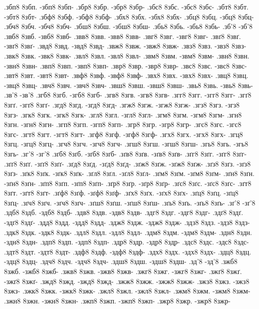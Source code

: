 {.збп8 8збп. -збп8 8збп-
.збр8 8збр. -збр8 8збр-
.збс8 8збс. -збс8 8збс-
.збт8 8збт. -збт8 8збт-
.збф8 8збф. -збф8 8збф-
.збх8 8збх. -збх8 8збх-
.збц8 8збц. -збц8 8збц-
.збч8 8збч. -збч8 8збч-
.збш8 8збш. -збш8 8збш-
.збь8 8збь. -збь8 8збь-
.зб'8 -зб'8
.звб8 8звб. -звб8 8звб-
.звв8 8звв. -звв8 8звв-
.звг8 8звг. -звг8 8звг-
.звґ8 8звґ. -звґ8 8звґ-
.звд8 8звд. -звд8 8звд-
.звж8 8звж. -звж8 8звж-
.звз8 8звз. -звз8 8звз-
.звк8 8звк. -звк8 8звк-
.звл8 8звл. -звл8 8звл-
.звм8 8звм. -звм8 8звм-
.звн8 8звн. -звн8 8звн-
.звп8 8звп. -звп8 8звп-
.звр8 8звр. -звр8 8звр-
.звс8 8звс. -звс8 8звс-
.звт8 8звт. -звт8 8звт-
.звф8 8звф. -звф8 8звф-
.звх8 8звх. -звх8 8звх-
.звц8 8звц. -звц8 8звц-
.звч8 8звч. -звч8 8звч-
.звш8 8звш. -звш8 8звш-
.звь8 8звь. -звь8 8звь-
.зв'8 -зв'8
.згб8 8згб. -згб8 8згб-
.згв8 8згв. -згв8 8згв-
.згг8 8згг. -згг8 8згг-
.згґ8 8згґ. -згґ8 8згґ-
.згд8 8згд. -згд8 8згд-
.згж8 8згж. -згж8 8згж-
.згз8 8згз. -згз8 8згз-
.згк8 8згк. -згк8 8згк-
.згл8 8згл. -згл8 8згл-
.згм8 8згм. -згм8 8згм-
.згн8 8згн. -згн8 8згн-
.згп8 8згп. -згп8 8згп-
.згр8 8згр. -згр8 8згр-
.згс8 8згс. -згс8 8згс-
.згт8 8згт. -згт8 8згт-
.згф8 8згф. -згф8 8згф-
.згх8 8згх. -згх8 8згх-
.згц8 8згц. -згц8 8згц-
.згч8 8згч. -згч8 8згч-
.згш8 8згш. -згш8 8згш-
.згь8 8згь. -згь8 8згь-
.зг'8 -зг'8
.зґб8 8зґб. -зґб8 8зґб-
.зґв8 8зґв. -зґв8 8зґв-
.зґг8 8зґг. -зґг8 8зґг-
.зґґ8 8зґґ. -зґґ8 8зґґ-
.зґд8 8зґд. -зґд8 8зґд-
.зґж8 8зґж. -зґж8 8зґж-
.зґз8 8зґз. -зґз8 8зґз-
.зґк8 8зґк. -зґк8 8зґк-
.зґл8 8зґл. -зґл8 8зґл-
.зґм8 8зґм. -зґм8 8зґм-
.зґн8 8зґн. -зґн8 8зґн-
.зґп8 8зґп. -зґп8 8зґп-
.зґр8 8зґр. -зґр8 8зґр-
.зґс8 8зґс. -зґс8 8зґс-
.зґт8 8зґт. -зґт8 8зґт-
.зґф8 8зґф. -зґф8 8зґф-
.зґх8 8зґх. -зґх8 8зґх-
.зґц8 8зґц. -зґц8 8зґц-
.зґч8 8зґч. -зґч8 8зґч-
.зґш8 8зґш. -зґш8 8зґш-
.зґь8 8зґь. -зґь8 8зґь-
.зґ'8 -зґ'8
.здб8 8здб. -здб8 8здб-
.здв8 8здв. -здв8 8здв-
.здг8 8здг. -здг8 8здг-
.здґ8 8здґ. -здґ8 8здґ-
.здд8 8здд. -здд8 8здд-
.здж8 8здж. -здж8 8здж-
.здз8 8здз. -здз8 8здз-
.здк8 8здк. -здк8 8здк-
.здл8 8здл. -здл8 8здл-
.здм8 8здм. -здм8 8здм-
.здн8 8здн. -здн8 8здн-
.здп8 8здп. -здп8 8здп-
.здр8 8здр. -здр8 8здр-
.здс8 8здс. -здс8 8здс-
.здт8 8здт. -здт8 8здт-
.здф8 8здф. -здф8 8здф-
.здх8 8здх. -здх8 8здх-
.здц8 8здц. -здц8 8здц-
.здч8 8здч. -здч8 8здч-
.здш8 8здш. -здш8 8здш-
.зд'8 -зд'8
.зжб8 8зжб. -зжб8 8зжб-
.зжв8 8зжв. -зжв8 8зжв-
.зжг8 8зжг. -зжг8 8зжг-
.зжґ8 8зжґ. -зжґ8 8зжґ-
.зжд8 8зжд. -зжд8 8зжд-
.зжж8 8зжж. -зжж8 8зжж-
.зжз8 8зжз. -зжз8 8зжз-
.зжк8 8зжк. -зжк8 8зжк-
.зжл8 8зжл. -зжл8 8зжл-
.зжм8 8зжм. -зжм8 8зжм-
.зжн8 8зжн. -зжн8 8зжн-
.зжп8 8зжп. -зжп8 8зжп-
.зжр8 8зжр. -зжр8 8зжр-
}
